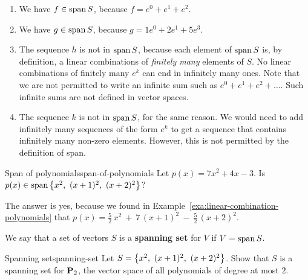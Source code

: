 \begin{solution}
  \begin{enumialphparenastyle}
    \begin{enumerate}
    \item We have $f\in\sspan S$, because $f = e^0 + e^1 + e^2$.
    \item We have $g\in\sspan S$, because $g = 1e^0 + 2e^1 + 5e^3$.
    \item The sequence $h$ is not in $\sspan S$, because each element
      of $\sspan S$ is, by definition, a linear combinations of {\em
        finitely many} elements of $S$. No linear combinations of
      finitely many $e^k$ can end in infinitely many ones. Note that
      we are not permitted to write an infinite sum such as
      $e^0+e^1+e^2+\ldots$. Such infinite sums are not defined in
      vector spaces.
    \item The sequence $k$ is not in $\sspan S$, for the same reason.
      We would need to add infinitely many sequences of the form $e^k$
      to get a sequence that contains infinitely many non-zero
      elements. However, this is not permitted by the definition of
      span.
    \end{enumerate}
  \end{enumialphparenastyle}
  \vspace{-4ex}
\end{solution}

\begin{example}{Span of polynomials}{span-of-polynomials}
  Let $p(x)=7x^2+4x-3$. Is $p(x)\in\sspan\set{x^2,~ (x+1)^2,~ (x+2)^2}$?
\end{example}

\begin{solution}
  The answer is yes, because we found in
  Example~\ref{exa:linear-combination-polynomials} that
  $p(x) = \frac{5}{2}\,x^2 ~+~ 7\,(x+1)^2 ~-~ \frac{5}{2}\,(x+2)^2$.
\end{solution}

We say that a set of vectors $S$ is a \textbf{spanning set}%
%
 for $V$ if $V = \sspan S$.

\begin{example}{Spanning set}{spanning-set}
  Let $S = \left\{x^2,~ (x+1)^2,~ (x+2)^2 \right\}$. Show that $S$ is a
  spanning set for $\mathbf{P}_2$, the vector space of all polynomials of
  degree at most $2$.
\end{example}

